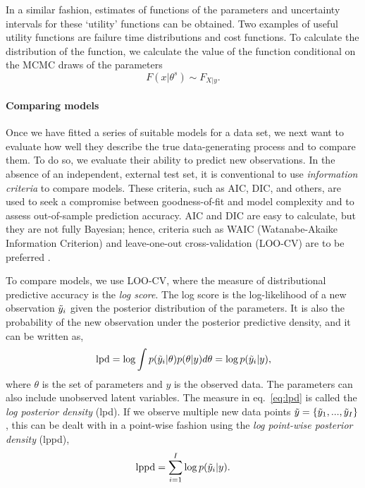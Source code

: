 In a similar fashion, estimates of functions of the parameters and uncertainty intervals for these `utility' functions can be obtained. Two examples of useful utility functions are failure time distributions and cost functions. To calculate the distribution of the function, we calculate the value of the function conditional on the MCMC draws of the parameters
\begin{equation}
  F(x|\theta^s) \sim F_{X|y}.
\end{equation}

\paragraph*{Comparing models}

Once we have fitted a series of suitable models for a data set, we next want to evaluate how well they describe the true data-generating process and to compare them. To do so, we evaluate their ability to predict new observations. In the absence of an independent, external test set, it is conventional to use \textit{information criteria} to compare models. These criteria, such as AIC, DIC, and others, are used to seek a compromise between goodness-of-fit and model complexity and to assess out-of-sample prediction accuracy. AIC and DIC are easy to calculate, but they are not fully Bayesian; hence, criteria such as WAIC (Watanabe-Akaike Information Criterion) and leave-one-out cross-validation (LOO-CV) are to be preferred \citep{Vehtari2017}.

To compare models, we use LOO-CV, where the measure of distributional predictive accuracy is the \emph{log score}. The log score is the log-likelihood of a new observation $\Tilde{y}_i$ given the posterior distribution of the parameters. It is also the probability of the new observation under the posterior predictive density, and it can be written as,
\begin{equation} \label{eq:lpd}
 \hbox{lpd} = \log \int p(\Tilde{y}_i|\theta)p(\theta|y)d\theta = \log p(\Tilde{y}_i | y),
\end{equation}
where $\theta$ is the set of parameters and $y$ is the observed data. The parameters can also include unobserved latent variables. The measure in eq.~\eqref{eq:lpd} is called the \textit{log posterior density} (lpd). If we observe multiple new data points $\Tilde{y} = \{\Tilde{y}_1, ..., \Tilde{y}_I\}$, this can be dealt with in a point-wise fashion using the \textit{log point-wise posterior density} (lppd),
\begin{equation} \label{eq:lppd}
 \hbox{lppd} = \sum^I_{i = 1} \log p(\Tilde{y}_i|y).
\end{equation}

